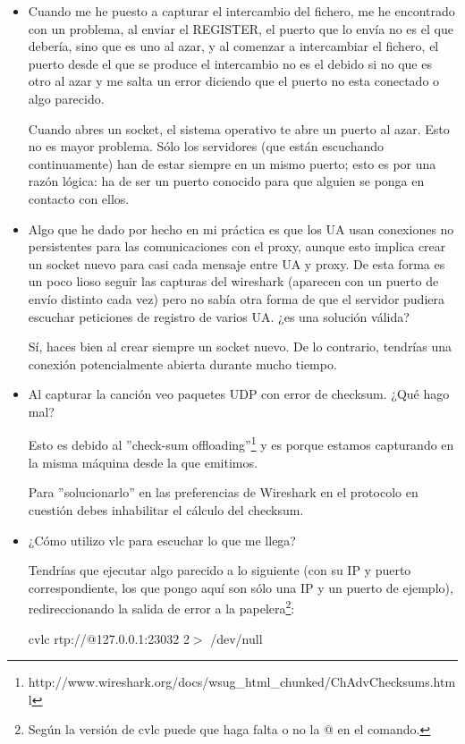 \documentclass[a4paper,11pt]{article}
\begin{document}
\begin{itemize}
\item Cuando me he puesto a capturar el intercambio del fichero, me he encontrado con un problema, al enviar el REGISTER, el puerto que lo envía no es el que debería, sino que es uno al azar, y al comenzar a intercambiar el fichero, el puerto desde el que se produce el intercambio no es el debido si no que es otro al azar y me salta un error diciendo que el puerto no esta conectado o algo parecido.

Cuando abres un socket, el sistema operativo te abre un puerto al azar. Esto no es mayor problema. Sólo los servidores (que están escuchando continuamente) han de estar siempre en un mismo puerto; esto es por una razón lógica: ha de ser un puerto conocido para que alguien se ponga en contacto con ellos.

\item Algo que he dado por hecho en mi práctica es que los UA usan conexiones no persistentes para las comunicaciones con el proxy, aunque esto implica crear un socket nuevo para casi cada mensaje entre UA y proxy. De esta forma es un poco lioso seguir las capturas del wireshark (aparecen con un puerto de envío distinto cada vez) pero no sabía otra forma de que el servidor pudiera escuchar peticiones de registro de varios UA. ¿es una solución válida?

Sí, haces bien al crear siempre un socket nuevo. De lo contrario, tendrías una conexión potencialmente abierta durante mucho tiempo.

\item Al capturar la canción veo paquetes UDP con error de checksum. ¿Qué hago mal?

Esto es debido al ''check-sum offloading''\footnote{http://www.wireshark.org/docs/wsug\_html\_chunked/ChAdvChecksums.html} y es porque estamos capturando en la misma máquina desde la que emitimos.

Para ''solucionarlo'' en las preferencias de Wireshark en el protocolo en cuestión debes inhabilitar el cálculo del checksum.

\item ¿Cómo utilizo vlc para escuchar lo que me llega?

Tendrías que ejecutar algo parecido a lo siguiente (con su IP y puerto correspondiente, los que pongo aquí son sólo una IP y un puerto de ejemplo), redireccionando la salida de error a la papelera\footnote{Según la versión de cvlc puede que haga falta o no la @ en el comando.}:

cvlc rtp://@127.0.0.1:23032 2$>$ /dev/null


\end{itemize}
\end{document}
